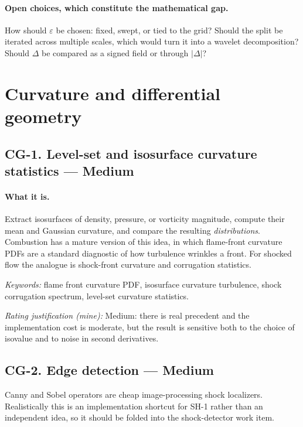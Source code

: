 \documentclass[11pt]{article}
\newcommand{\Med}{Medium}
\newcommand{\keywords}[1]{\par\smallskip\noindent\textit{Keywords:} #1}
\newcommand{\rating}[1]{\par\smallskip\noindent\textit{Rating justification (mine):} #1}
\begin{document}
\paragraph{Open choices, which constitute the mathematical gap.} How should
$\varepsilon$ be chosen: fixed, swept, or tied to the grid? Should the split be iterated
across multiple scales, which would turn it into a wavelet decomposition? Should $\Delta$
be compared as a signed field or through $|\Delta|$?

\section{Curvature and differential geometry}

\subsection{CG-1. Level-set and isosurface curvature statistics --- \Med{}}

\paragraph{What it is.} Extract isosurfaces of density, pressure, or vorticity magnitude,
compute their mean and Gaussian curvature, and compare the resulting \emph{distributions}.
Combustion has a mature version of this idea, in which flame-front curvature PDFs are a
standard diagnostic of how turbulence wrinkles a front. For shocked flow the analogue is
shock-front curvature and corrugation statistics.

\keywords{flame front curvature PDF, isosurface curvature turbulence, shock corrugation
spectrum, level-set curvature statistics.}

\rating{Medium: there is real precedent and the implementation cost is moderate, but the
result is sensitive both to the choice of isovalue and to noise in second derivatives.}

\subsection{CG-2. Edge detection --- \Med{}}

Canny and Sobel operators are cheap image-processing shock localizers. Realistically this is
an implementation shortcut for SH-1 rather than an independent idea, so it should be folded
into the shock-detector work item.
\end{document}
